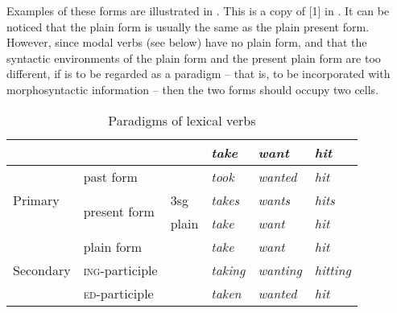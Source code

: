\documentclass[UTF8, a4paper, oneside, scheme=plain, 12pt]{ctexbook}
\newcommand*{\citesec}[1]{\S~{#1}}
\newcommand{\form}[1]{\emph{#1}}
\newcommand{\formcat}[1]{\textsc{#1}}
\begin{document}
Examples of these forms are illustrated in . 
This is a copy of [1] in \citet[\citesec{1.1}]{cgel}.
It can be noticed that the plain form is usually the same as the plain present form.
However, since modal verbs (see below) have no plain form,
and that the syntactic environments of the plain form and the present plain form are too different,
if  is to be regarded as a paradigm
-- that is, to be incorporated with morphosyntactic information -- 
then the two forms should occupy two cells.

\begin{table}[H]
    \caption{Paradigms of lexical verbs}
    \label{tbl:lexical-inflection}
    \centering
    \begin{tabular}{@{}llllll@{}}
    \toprule
    \multicolumn{1}{l}{}       &                               &       & \form{take}   & \form{want}    & \form{hit}     \\ \midrule
    \multirow{3}{*}{Primary}   & past form                     &       & \form{took}   & \form{wanted}  & \form{hit}     \\
                               & \multirow{2}{*}{present form} & 3sg   & \form{takes}  & \form{wants}   & \form{hits}    \\
                               &                               & plain & \form{take}   & \form{want}    & \form{hit}     \\ \midrule
    \multirow{3}{*}{Secondary} & plain form                    &       & \form{take}   & \form{want}    & \form{hit}     \\
                               & \formcat{ing}-participle       &       & \form{taking} & \form{wanting} & \form{hitting} \\
                               & \formcat{ed}-participle        &       & \form{taken}  & \form{wanted}  & \form{hit}     \\ \bottomrule
    \end{tabular}
\end{table}
\end{document}
